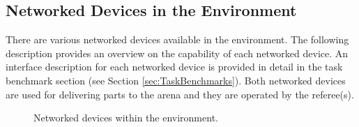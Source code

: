 

\subsection{Networked Devices in the Environment}
\label{ssec:NetworkedDevices}
There are various networked devices available in the \erlir environment. 
The following description provides an overview on the capability of each networked device.
An interface description for each networked device is provided in detail in the task benchmark section (see Section \ref{sec:TaskBenchmarks}).
Both networked devices are used for delivering parts to the \erlir arena and they are operated by the referee(s).


\begin{figure}[htb]
	\begin{center}
		\hfill
		\hfill
		\hfill\mbox{}
		\caption{Networked devices within the \erlir environment.}
		\label{fig:NutshellNetworkedDevices} 
	\end{center}
\end{figure}

